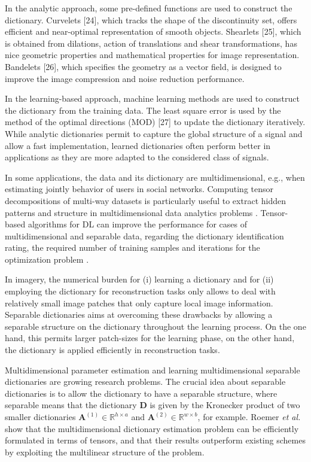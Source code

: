 In the analytic approach, some pre-defined functions are used to construct the dictionary. Curvelets [24], which tracks the shape of the discontinuity set, offers efficient and near-optimal representation of smooth objects. Shearlets [25], which is obtained from dilations, action of translations and shear transformations, has nice geometric properties and mathematical properties for image representation. Bandelets [26], which specifies the geometry as a vector field, is designed to improve the image compression and noise reduction performance. 

In the learning-based approach, machine learning methods are used to construct the dictionary from the training data. The least square error is used by the method of the optimal directions (MOD) [27] to update the dictionary iteratively. While analytic dictionaries permit to capture the global structure of a signal and allow a fast implementation, learned dictionaries often perform better in applications as they are more adapted to the considered class of signals.

In some applications, the data and its dictionary are multidimensional, e.g., when estimating jointly behavior of users in social networks. Computing tensor decompositions of multi-way datasets is particularly useful to extract hidden patterns and structure in multidimensional data analytics problems \cite{kolda2009tensor}. Tensor-based algorithms for DL can improve the performance for cases of multidimensional and separable data, regarding the dictionary identification rating, the required number of training samples and iterations for the optimization problem \cite{roemer2014tensor}. 

In imagery, the numerical burden for (i) learning a dictionary and for (ii) employing the dictionary for reconstruction tasks only allows to deal with relatively small image patches that only capture local image information. Separable dictionaries aims at overcoming these drawbacks by allowing a separable structure on the dictionary throughout the learning process. On the one hand, this permits larger patch-sizes for the learning phase, on the other hand, the dictionary is applied efficiently in reconstruction tasks. 

Multidimensional parameter estimation and learning multidimensional separable dictionaries are growing research problems. The crucial idea about separable dictionaries is to allow the dictionary to have a separable structure, where separable means that the dictionary $\textbf{D}$ is given by the Kronecker product of two smaller dictionaries $\boldsymbol{A}^{(1)} \in \mathbb{R}^{h \times a}$ and $\boldsymbol{A}^{(2)} \in \mathbb{R}^{w \times b}$, for example. Roemer \emph{et al.} \cite{roemer2014tensor} show that the multidimensional dictionary estimation problem can be efficiently formulated in terms of tensors, and that their results outperform existing schemes by exploiting the multilinear structure of the problem.

